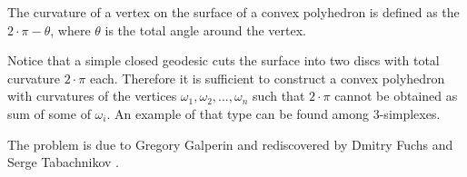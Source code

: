 The curvature of a vertex on the surface of a convex polyhedron
is defined as the $2\cdot\pi-\theta$, where $\theta$ is the total angle around the vertex.

Notice that a simple closed geodesic cuts the surface into two discs with total curvature $2\cdot\pi$ each.
Therefore it is sufficient to construct a convex polyhedron with curvatures of the vertices $\omega_1,\omega_2,\dots,\omega_n$ such that
$2\cdot\pi$ cannot be obtained as sum of some of $\omega_i$.
An example of that type can be found among 3-simplexes.
\qeds

The problem is due to Gregory Galperin \cite[see][]{galperin} 
and rediscovered by Dmitry Fuchs and Serge Tabachnikov \cite[see 20.8 in][]{fuchs-tabachnikov}.

